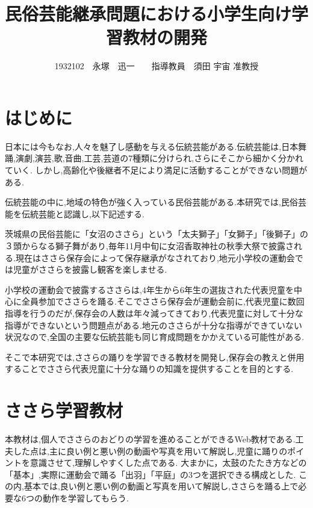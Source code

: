 \documentclass[twocolumn,10pt,a4j]{ltjsarticle}
\title{民俗芸能継承問題における小学生向け学習教材の開発}
\author{1932102　永塚　迅一　　指導教員　須田 宇宙 准教授}
\date{}
\begin{document}
\maketitle
\section{はじめに}


日本には今もなお,人々を魅了し感動を与える伝統芸能がある.伝統芸能は,日本舞踊,演劇,演芸,歌,音曲,工芸,芸道の7種類に分けられ,さらにそこから細かく分かれていく.
しかし,高齢化や後継者不足により満足に活動することができない問題がある.

伝統芸能の中に,地域の特色が強く入っている民俗芸能がある.本研究では,民俗芸能を伝統芸能と認識し,以下記述する.

茨城県の民俗芸能に「女沼のささら」という「太夫獅子」「女獅子」「後獅子」の３頭からなる獅子舞があり,毎年11月中旬に女沼香取神社の秋季大祭で披露される\cite{suda2018}.現在はささら保存会によって保存継承がなされており,地元小学校の運動会では児童がささらを披露し観客を楽しませる.

小学校の運動会で披露するささらは,4年生から6年生の選抜された代表児童を中心に全員参加でささらを踊る.そこでささら保存会が運動会前に,代表児童に数回指導を行うのだが,保存会の人数は年々減ってきており,代表児童に対して十分な指導ができないという問題点がある.地元のささらが十分な指導ができていない状況なので,全国の主要な伝統芸能も同じ育成問題をかかえている可能性がある.

そこで本研究では,ささらの踊りを学習できる教材を開発し,保存会の教えと併用することでささら代表児童に十分な踊りの知識を提供することを目的とする.

\section{ささら学習教材}
本教材は,個人でささらのおどりの学習を進めることができるWeb教材である.工夫した点は,主に良い例と悪い例の動画や写真を用いて解説し,児童に踊りのポイントを意識させて,理解しやすくした点である.
大まかに，太鼓のたたき方などの「基本」,実際に運動会で踊る「出羽」「平庭」の3つを選択できる構成とした.
この内,基本では,良い例と悪い例の動画と写真を用いて解説し,ささらを踊る上で必要な6つの動作を学習してもらう.
\end{document}
